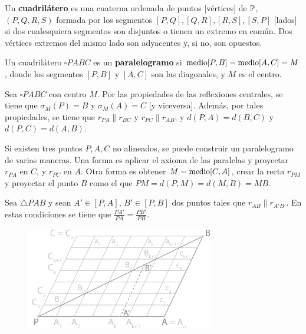  Un \textbf{cuadrilátero} es una cuaterna ordenada de puntos [vértices] de $\P$, $(P, Q, R, S)$ formada por los segmentos $[P,Q], [Q,R], [R,S], [S,P]$ [lados] si dos cualesquiera segmentos son disjuntos o tienen un extremo en común. Dos vértices extremos del mismo lado son adyacentes y, si no, son opuestos.

 Un cuadrilátero $\square PABC$ es un \textbf{paralelogramo} si $\m[P,B] = \m[A,C] = M$, donde los segmentos $[P,B]$ y $[A,C]$ son las diagonales, y $M$ es el centro.

 Sea $\square PABC$ con centro $M$. Por las propiedades de las reflexiones centrales, se tiene que $\sigma_M(P) = B$ y $\sigma_M(A) = C$ [y viceversa]. Además, por tales propiedades, se tiene que $r_{PA} \parallel r_{BC}$ y $r_{PC} \parallel r_{AB}$; y $d(P,A) = d(B, C)$ y $d(P,C) = d(A,B)$. 

 Si existen tres puntos $P,A,C$ no alineados, se puede construir un paralelogramo de varias maneras. Una forma es aplicar el axioma de las paralelas y proyectar $r_{PA}$ en $C$, y $r_{PC}$ en $A$. Otra forma es obtener $M  = \m[C,A]$, crear la recta $r_{PM}$ y proyectar el punto $B$ como el que $PM = d(P,M) = d(M,B) = MB$.

 Sea $\triangle PAB$ y sean $A' \in [P,A]$, $B' \in  [P,B]$ dos puntos tales que $r_{AB} \parallel r_{A'B'}$. En estas condiciones se tiene que $\frac{PA'}{PA} = \frac{PB'}{PB}$.

\begin{figure}[H]
	\centering
	\includegraphics[width=8.2cm]{figuras/5-5.png}
	\vspace{-1em}
\end{figure}

